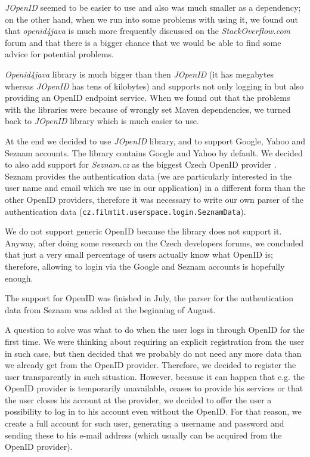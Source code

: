 \emph{JOpenID} seemed to be easier to use and also was much smaller as a dependency; on the other hand, when we run into some problems with using it, we found out that \emph{openid4java} is much more frequently discussed on the \emph{StackOverflow.com} forum and that there is a bigger chance that we would be able to find some advice for potential problems.

\emph{Openid4java} library is much bigger than then \emph{JOpenID} (it has megabytes whereas \emph{JOpenID} has tens of kilobytes) and supports not only logging in but also providing an OpenID endpoint service. When we found out that the problems with the libraries were because of wrongly set Maven dependencies, we turned back to \emph{JOpenID} library which is much easier to use.

At the end we decided to use \emph{JOpenID} library, and to support Google, Yahoo and Seznam accounts. The library contains Google and Yahoo by default. We decided to also add support for \emph{Seznam.cz} as the biggest Czech OpenID provider . Seznam provides the authentication data (we are particularly interested in the user name and email which we use in our application) in a different form than the other OpenID providers, therefore it was necessary to write our own parser of the authentication data ({\tt{cz.filmtit.userspace.login.SeznamData}}).

We do not support generic OpenID because the library does not support it. Anyway, after doing some research on the Czech developers forums, we concluded that just a very small percentage of users actually know what OpenID is; therefore, allowing to login via the Google and Seznam accounts is hopefully enough.

The support for OpenID was finished in July, the parser for the authentication data from Seznam was added at the beginning of August.

A question to solve was what to do when the user logs in through OpenID for the first time. We were thinking about requiring an explicit registration from the user in such case, but then decided that we probably do not need any more data than we already get from the OpenID provider. Therefore, we decided to register the user transparently in such situation.
However, because it can happen that e.g. the OpenID provider is temporarily unavailable, ceases to provide his services or that the user closes his account at the provider, we decided to offer the user a possibility to log in to his account even without the OpenID. For that reason, we create a full account for such user, generating a username and password and sending these to his e-mail address (which usually can be acquired from the OpenID provider).


